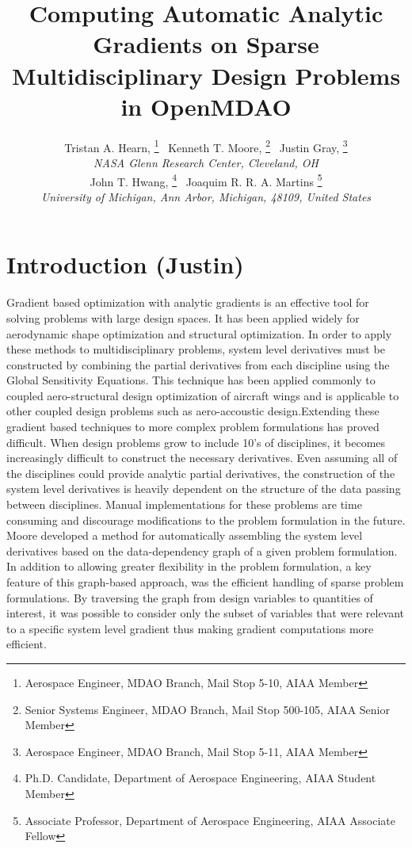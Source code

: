 \documentclass[]{aiaa-tc} %
\title{Computing Automatic Analytic Gradients on Sparse Multidisciplinary Design Problems in OpenMDAO}
\author{
  Tristan A. Hearn,%
     \thanks{Aerospace Engineer, MDAO Branch, Mail Stop 5-10, AIAA Member}
  \ Kenneth T. Moore,%
     \thanks{Senior Systems Engineer, MDAO Branch, Mail Stop 500-105, AIAA Senior Member}
  \ Justin Gray,%
     \thanks{Aerospace Engineer, MDAO Branch, Mail Stop 5-11, AIAA Member}
   \\
  {\normalsize\itshape
  NASA Glenn Research Center, Cleveland, OH}  \\
  John T. Hwang,%
  \thanks{Ph.D. Candidate, Department of Aerospace Engineering, AIAA Student Member}
  \ Joaquim R. R. A. Martins%
  \thanks{Associate Professor, Department of Aerospace Engineering, AIAA Associate Fellow}
  \\
  {\normalsize\itshape
   University of Michigan, Ann Arbor, Michigan, 48109, United States}
}
\begin{document}
  \maketitle

  \begin{abstract}

  \end{abstract}

  \section{Introduction (Justin)}

    Gradient based optimization with analytic gradients is an effective tool for solving problems
    with large design spaces. It has been applied widely for aerodynamic shape optimization \cite{Liou2010,palacios2012adjoint}
    and structural optimization\cite{Kennedy:2013:TACS, Venkataraman:2004:SOC, Adelman:1986:structure-sensitivity}.
    In order to apply these methods to multidisciplinary problems, system level derivatives must be
    constructed by combining the partial derivatives from each discipline using the Global Sensitivity
    Equations\cite{Sobieski1990}. This technique has been applied commonly to coupled
    aero-structural design optimization of aircraft wings\cite{Kenway2012c, Haghighat2012} and is applicable to
    other coupled design problems such as aero-accoustic design\cite{economon2012coupled}.Extending these
    gradient based techniques to more complex problem formulations has proved difficult. When
    design problems grow to include 10's of disciplines, it becomes increasingly difficult to construct the
    necessary derivatives. Even assuming all of the disciplines could provide analytic partial derivatives,
    the construction of the system level derivatives is heavily dependent on the structure of the data passing
    between disciplines. Manual implementations for these problems are time consuming and discourage modifications
    to the problem formulation in the future. Moore developed a method for automatically assembling the system
    level derivatives based on the data-dependency graph of a given problem formulation\cite{openmdao_derivatives}.
    In addition to allowing greater flexibility in the problem formulation, a key feature of this graph-based approach, was the efficient
    handling of sparse problem formulations. By traversing the graph from design variables to quantities of interest,
    it was possible to consider only the subset of variables that were relevant to a specific system level gradient thus
    making gradient computations more efficient.
\end{document}
